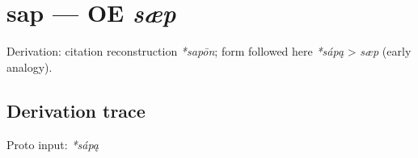 \documentclass[
  british,
  a4paper,
  openany]{book}
\providecommand{\texorpdfstring}[2]{#1}
\begin{document}
\section{\texorpdfstring{sap --- OE
\emph{sæp}}{sap --- OE sæp}}\label{sap-oe-suxe6p}


Derivation: citation reconstruction \emph{*sapōn}; form followed here
\emph{*sápą} \textgreater{} \emph{sæp} (early analogy).

\subsection{Derivation trace}\label{derivation-trace-93}

Proto input: \emph{*sápą}

\begingroup
\setlength{\fboxsep}{6pt}
\end{document}
